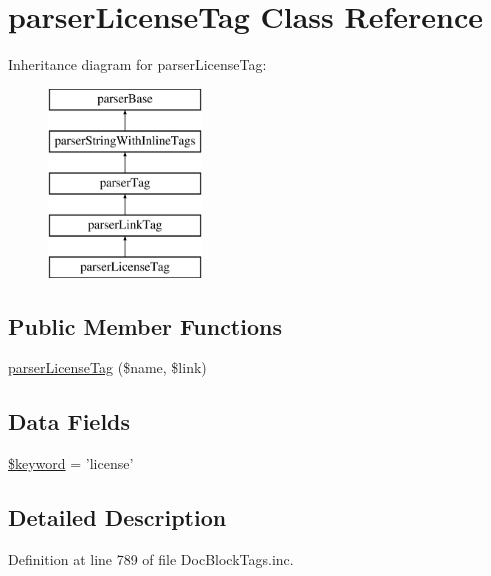 \hypertarget{classparser_license_tag}{\section{parser\-License\-Tag \-Class \-Reference}
\label{classparser_license_tag}
}
\-Inheritance diagram for parser\-License\-Tag\-:\begin{figure}[H]
\begin{center}
\leavevmode
\includegraphics[height=5.000000cm]{classparser_license_tag}
\end{center}
\end{figure}
\subsection*{\-Public \-Member \-Functions}
\begin{DoxyCompactItemize}
\item 
\hyperlink{classparser_license_tag_a7f76dc500c5b1779736ce7bbab3bed0a}{parser\-License\-Tag} (\$name, \$link)
\end{DoxyCompactItemize}
\subsection*{\-Data \-Fields}
\begin{DoxyCompactItemize}
\item 
\hyperlink{classparser_license_tag_a4a925d6b38bcf3957c713a7d3dc7da1f}{\$keyword} = 'license'
\end{DoxyCompactItemize}


\subsection{\-Detailed \-Description}


\-Definition at line 789 of file \-Doc\-Block\-Tags.\-inc.



